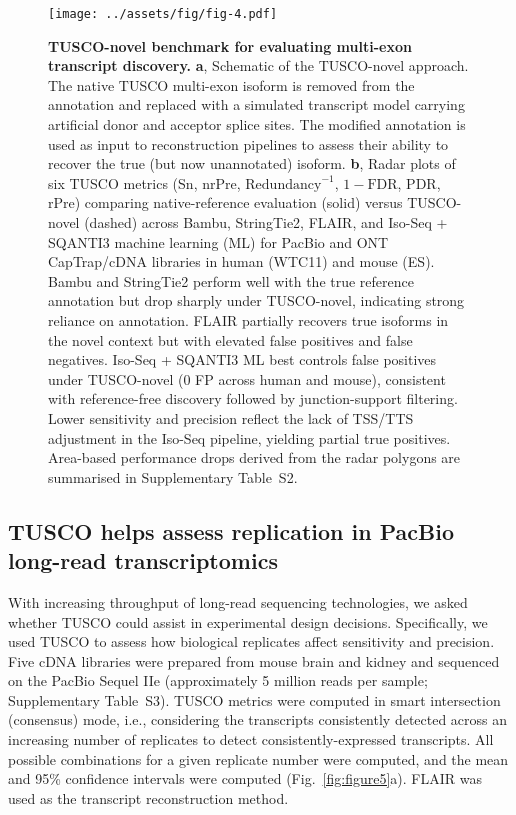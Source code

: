 \documentclass[pdflatex,sn-nature]{sn-jnl}%
\begin{document}
\begin{figure}[p]
    \centering
    \texttt{[image: ../assets/fig/fig-4.pdf]}
    \caption{\textbf{TUSCO-novel benchmark for evaluating multi-exon transcript discovery.} \textbf{a}, Schematic of the TUSCO-novel approach. The native TUSCO multi-exon isoform is removed from the annotation and replaced with a simulated transcript model carrying artificial donor and acceptor splice sites. The modified annotation is used as input to reconstruction pipelines to assess their ability to recover the true (but now unannotated) isoform. \textbf{b}, Radar plots of six TUSCO metrics (Sn, nrPre, $\mathrm{Redundancy}^{-1}$, $1 - \mathrm{FDR}$, PDR, rPre) comparing native-reference evaluation (solid) versus TUSCO-novel (dashed) across Bambu, StringTie2, FLAIR, and Iso-Seq + SQANTI3 machine learning (ML) for PacBio and ONT CapTrap/cDNA libraries in human (WTC11) and mouse (ES). Bambu and StringTie2 perform well with the true reference annotation but drop sharply under TUSCO-novel, indicating strong reliance on annotation. FLAIR partially recovers true isoforms in the novel context but with elevated false positives and false negatives. Iso-Seq + SQANTI3 ML best controls false positives under TUSCO-novel (0 FP across human and mouse), consistent with reference-free discovery followed by junction-support filtering. Lower sensitivity and precision reflect the lack of TSS/TTS adjustment in the Iso-Seq pipeline, yielding partial true positives. Area-based performance drops derived from the radar polygons are summarised in Supplementary Table~S2.}
    \label{fig:figure4}
\end{figure}

\subsection{TUSCO helps assess replication in PacBio long-read transcriptomics}

With increasing throughput of long-read sequencing technologies, we asked whether TUSCO could assist in experimental design decisions. Specifically, we used TUSCO to assess how biological replicates affect sensitivity and precision. Five cDNA libraries were prepared from mouse brain and kidney and sequenced on the PacBio Sequel IIe (approximately 5 million reads per sample; Supplementary Table~S3). TUSCO metrics were computed in smart intersection (consensus) mode, i.e., considering the transcripts consistently detected across an increasing number of replicates to detect consistently-expressed transcripts. All possible combinations for a given replicate number were computed, and the mean and 95\% confidence intervals were computed (Fig.~\ref{fig:figure5}a). FLAIR was used as the transcript reconstruction method.
\end{document}
